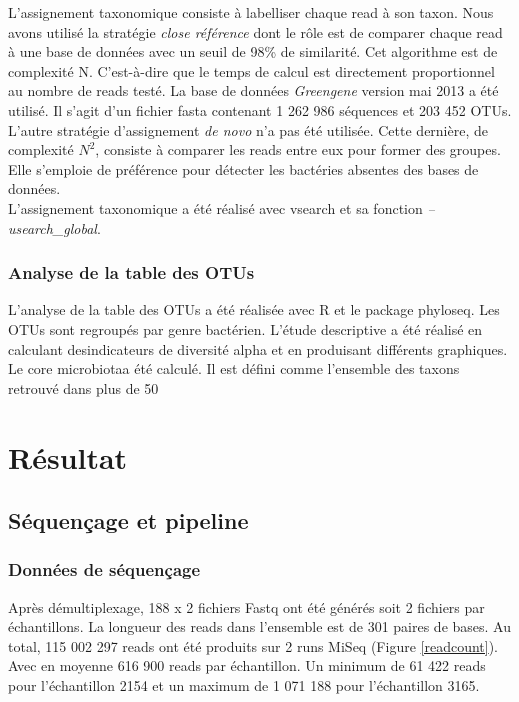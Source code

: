 \documentclass[12pt,a4paper]{article}
\begin{document}
L’assignement taxonomique consiste à labelliser chaque read à son taxon. Nous avons utilisé la stratégie \textit{close référence} dont le rôle est de comparer chaque read à une base de données avec un seuil de 98\% de similarité. Cet algorithme est de complexité N. C'est-à-dire que le temps de calcul est directement proportionnel au nombre de reads testé. La base de données \textit{Greengene} version mai 2013  a été utilisé. Il s'agit d'un fichier fasta contenant 1 262 986 séquences et 203 452 OTUs. \\
L'autre stratégie d'assignement \textit{de novo} n'a pas été utilisée. Cette dernière, de complexité $N^{2}$, consiste à comparer les reads entre eux pour former des groupes. Elle s'emploie de préférence pour détecter les bactéries absentes des bases de données. \\
L'assignement taxonomique a été réalisé avec vsearch et sa fonction \textit{--usearch\_global}. 

\subsubsection{Analyse de la table des OTUs}
L’analyse de la table des OTUs a été réalisée avec R et le package phyloseq. Les OTUs sont  regroupés par genre bactérien. L’étude descriptive a été réalisé en calculant desindicateurs de diversité alpha et en produisant différents graphiques. Le core microbiotaa été calculé. Il est défini comme l’ensemble des taxons retrouvé dans plus de 50%


\section{Résultat}
\subsection{Séquençage et pipeline}
\subsubsection{Données de séquençage}
Après démultiplexage, 188 x 2 fichiers Fastq ont été générés soit 2 fichiers par échantillons.
La longueur des reads dans l'ensemble est de 301 paires de bases.
Au total, 115 002 297 reads ont été produits sur 2 runs MiSeq (Figure \ref{readcount}). Avec en moyenne 616 900 reads par échantillon. Un minimum de 61 422 reads pour l’échantillon 2154 et un maximum de 1 071 188 pour l’échantillon 3165. 
\end{document}
